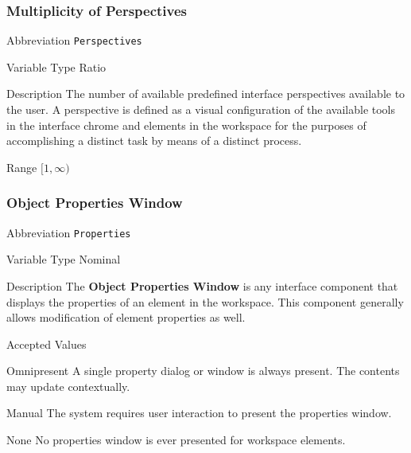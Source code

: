 \subsubsection{Multiplicity of Perspectives}
\label{subsubsec:perspectives}

\begin{AlignedDesc}
  \item[Abbreviation] \texttt{Perspectives}

  \item[Variable Type] Ratio

  \item[Description] The number of available predefined interface
  perspectives available to the user. A perspective is defined as a visual
  configuration of the available tools in the interface chrome and elements
  in the workspace for the purposes of accomplishing a distinct task by
  means of a distinct process.

  \item[Range] $[1 , \infty)$

\end{AlignedDesc}

\subsubsection{Object Properties Window}
\label{subsubsec:properties}

\begin{AlignedDesc}
  \item[Abbreviation] \texttt{Properties}

  \item[Variable Type] Nominal

  \item[Description] The \textbf{Object Properties Window} is any interface
  component that displays the properties of an element in the workspace.
  This component generally allows modification of element properties as
  well.

  \item[Accepted Values]

  \begin{AlignedDesc}
    \item[Omnipresent] A single property dialog or window is always
    present. The contents may update contextually.
    \item[Manual] The system requires user interaction to present the
    properties window.
    \item[None] No properties window is ever presented for workspace
    elements.
  \end{AlignedDesc}

\end{AlignedDesc}

